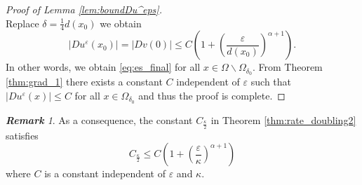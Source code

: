\documentclass[12pt,reqno]{amsart}
\numberwithin{figure}{section}
\theoremstyle{plain}
\theoremstyle{remark}
\newtheorem{rem}{\bf{Remark}}
\numberwithin{equation}{section}
\begin{document}
\begin{proof}[Proof of Lemma \ref{lem:boundDu^eps}]
\begin{equation*}
\end{equation*}
Replace $\delta = \frac{1}{4}d(x_0)$ we obtain
\begin{equation*}
    |Du^\varepsilon(x_0)| = |Dv(0)| \leq C\left(1+ \left(\frac{\varepsilon}{d(x_0)}\right)^{\alpha+1}\right).
\end{equation*}
In other words, we obtain \eqref{eq:es_final} for all $x\in \Omega\backslash\Omega_{\delta_0}$. From Theorem \ref{thm:grad_1} there exists a constant $C$ independent of $\varepsilon$ such that $|Du^\varepsilon(x)|\leq C$ for all $x\in \Omega_{\delta_0}$ and thus the proof is complete.
\end{proof}

\begin{rem} As a consequence, the constant $C_{\frac{\kappa}{2}}$ in Theorem \ref{thm:rate_doubling2} satisfies
\begin{equation*}
    C_{\frac{\kappa}{2}} \leq C\left(1+\left(\frac{\varepsilon}{\kappa}\right)^{\alpha+1}\right)
\end{equation*}
where $C$ is a constant independent of $\varepsilon$ and $\kappa$.
\end{rem}
\end{document}
